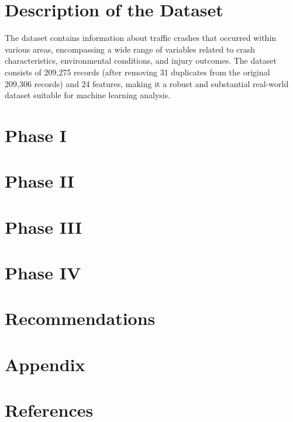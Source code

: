 \documentclass[12pt,man]{apa7}
\begin{document}
\section{Description of the Dataset}

The dataset contains information about traffic crashes that occurred within various areas, encompassing a wide range of variables 
related to crash characteristics, environmental conditions, and injury outcomes. The dataset consists of 209,275 records (after removing 
31 duplicates from the original 209,306 records) and 24 features, making it a robust and substantial real-world dataset suitable for machine 
learning analysis. 

\section{Phase I}

\section{Phase II}

\section{Phase III}

\section{Phase IV}

\section{Recommendations}

\section{Appendix}

\section{References}
\end{document}
